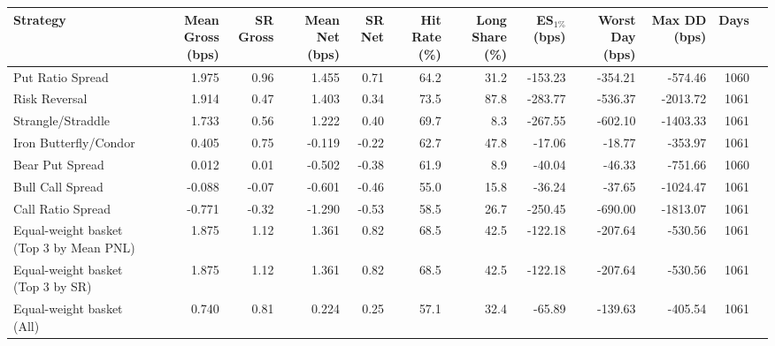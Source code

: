 \begin{tabular}{lrrrrrrrrrrr}
\toprule
Strategy & Mean Gross (bps) & SR Gross & Mean Net (bps) & SR Net & Hit Rate (\%) & Long Share (\%) & ES$_{1\%}$ (bps) & Worst Day (bps) & Max DD (bps) & Days \\
\midrule
Put Ratio Spread & 1.975 & 0.96 & 1.455 & 0.71 & 64.2 & 31.2 & -153.23 & -354.21 & -574.46 & 1060 \\
Risk Reversal & 1.914 & 0.47 & 1.403 & 0.34 & 73.5 & 87.8 & -283.77 & -536.37 & -2013.72 & 1061 \\
Strangle/Straddle & 1.733 & 0.56 & 1.222 & 0.40 & 69.7 & 8.3 & -267.55 & -602.10 & -1403.33 & 1061 \\
Iron Butterfly/Condor & 0.405 & 0.75 & -0.119 & -0.22 & 62.7 & 47.8 & -17.06 & -18.77 & -353.97 & 1061 \\
Bear Put Spread & 0.012 & 0.01 & -0.502 & -0.38 & 61.9 & 8.9 & -40.04 & -46.33 & -751.66 & 1060 \\
Bull Call Spread & -0.088 & -0.07 & -0.601 & -0.46 & 55.0 & 15.8 & -36.24 & -37.65 & -1024.47 & 1061 \\
Call Ratio Spread & -0.771 & -0.32 & -1.290 & -0.53 & 58.5 & 26.7 & -250.45 & -690.00 & -1813.07 & 1061 \\
\midrule
Equal-weight basket (Top 3 by Mean PNL) & 1.875 & 1.12 & 1.361 & 0.82 & 68.5 & 42.5 & -122.18 & -207.64 & -530.56 & 1061 \\
Equal-weight basket (Top 3 by SR) & 1.875 & 1.12 & 1.361 & 0.82 & 68.5 & 42.5 & -122.18 & -207.64 & -530.56 & 1061 \\
Equal-weight basket (All) & 0.740 & 0.81 & 0.224 & 0.25 & 57.1 & 32.4 & -65.89 & -139.63 & -405.54 & 1061 \\
\bottomrule
\end{tabular}
